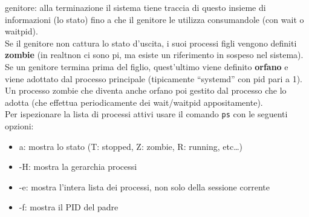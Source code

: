 \begin{flushleft}
\begin{flushleft}
\begin{flushleft}
      genitore: alla terminazione il sistema tiene traccia di questo insieme di informazioni 
      (lo stato) fino a che il genitore le utilizza consumandole (con wait o waitpid). \\
      Se il genitore non cattura lo stato d'uscita, i suoi processi figli vengono definiti \textbf{zombie} 
      (in realt\ace non ci sono pi\acu, ma esiste un riferimento in sospeso nel sistema). \\
      Se un genitore termina prima del figlio, quest'ultimo viene definito \textbf{orfano} e viene 
      adottato dal processo principale (tipicamente “systemd” con pid pari a 1). \\
      Un processo zombie che diventa anche orfano \ace poi gestito dal processo che lo adotta 
      (che effettua periodicamente dei wait/waitpid appositamente). \\
      Per ispezionare la lista di processi attivi usare il comando \texttt{ps} con le seguenti 
      opzioni:
      \begin{itemize}
        \item a: mostra lo stato (T: stopped, Z: zombie, R: running, etc…)
        \item -H: mostra la gerarchia processi
        \item -e: mostra l'intera lista dei processi, non solo della sessione corrente
        \item -f: mostra il PID del padre
      \end{itemize}
    \end{flushleft}
  \end{flushleft}
\end{flushleft}